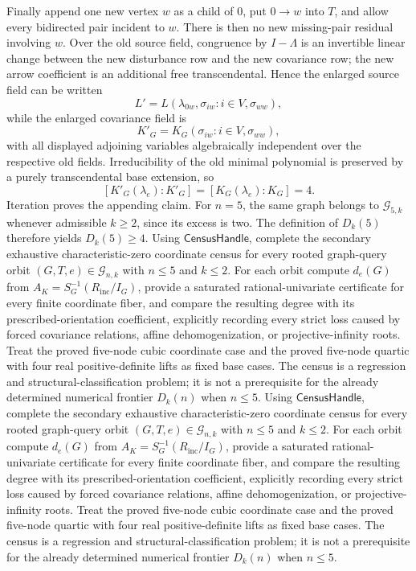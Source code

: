 Finally append one new vertex \(w\) as a child of \(0\), put \(0\to w\) into \(T\), and allow every bidirected pair incident to \(w\). There is then no new missing-pair residual involving \(w\). Over the old source field, congruence by \(I-\Lambda\) is an invertible linear change between the new disturbance row and the new covariance row; the new arrow coefficient is an additional free transcendental. Hence the enlarged source field can be written
\[
L'=L(\lambda_{0w},\sigma_{iw}:i\in V,\sigma_{ww}),
\]
while the enlarged covariance field is
\[
K'_G=K_G(\sigma_{iw}:i\in V,\sigma_{ww}),
\]
with all displayed adjoining variables algebraically independent over the respective old fields. Irreducibility of the old minimal polynomial is preserved by a purely transcendental base extension, so
\[
[K'_G(\lambda_e):K'_G]=[K_G(\lambda_e):K_G]=4.
\]
Iteration proves the appending claim. For \(n=5\), the same graph belongs to \(\mathcal G_{5,k}\) whenever admissible \(k\ge2\), since its excess is two. The definition of \(D_k(5)\) therefore yields \(D_k(5)\ge4\).
Using \(\mathsf{CensusHandle}\), complete the secondary exhaustive characteristic-zero coordinate census for every rooted graph-query orbit \((G,T,e)\in\mathcal G_{n,k}\) with \(n\le5\) and \(k\le2\). For each orbit compute \(d_e(G)\) from \(A_K=S_G^{-1}(R_{\mathrm{inc}}/I_G)\), provide a saturated rational-univariate certificate for every finite coordinate fiber, and compare the resulting degree with its prescribed-orientation coefficient, explicitly recording every strict loss caused by forced covariance relations, affine dehomogenization, or projective-infinity roots. Treat the proved five-node cubic coordinate case and the proved five-node quartic with four real positive-definite lifts as fixed base cases. The census is a regression and structural-classification problem; it is not a prerequisite for the already determined numerical frontier \(D_k(n)\) when \(n\le5\).
Using \(\mathsf{CensusHandle}\), complete the secondary exhaustive characteristic-zero coordinate census for every rooted graph-query orbit \((G,T,e)\in\mathcal G_{n,k}\) with \(n\le5\) and \(k\le2\). For each orbit compute \(d_e(G)\) from \(A_K=S_G^{-1}(R_{\mathrm{inc}}/I_G)\), provide a saturated rational-univariate certificate for every finite coordinate fiber, and compare the resulting degree with its prescribed-orientation coefficient, explicitly recording every strict loss caused by forced covariance relations, affine dehomogenization, or projective-infinity roots. Treat the proved five-node cubic coordinate case and the proved five-node quartic with four real positive-definite lifts as fixed base cases. The census is a regression and structural-classification problem; it is not a prerequisite for the already determined numerical frontier \(D_k(n)\) when \(n\le5\).
